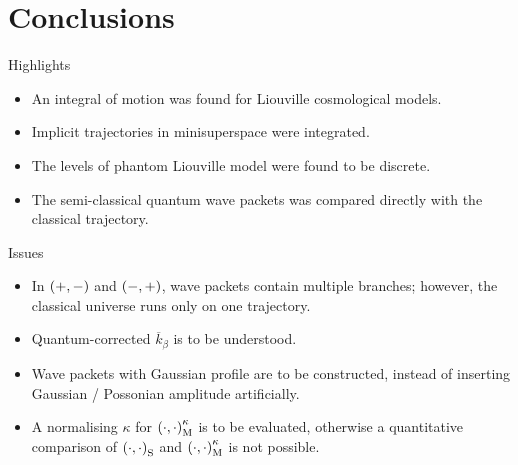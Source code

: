 \documentclass[9pt]{beamer}
\begin{document}
\section{Conclusions}

\begin{frame}%
{Highlights}%
\begin{itemize}
\item An \alert{integral of motion} was found for Liouville cosmological
models.
\item \alert{Implicit trajectories} in minisuperspace were integrated.
\item The levels of phantom Liouville model were found to be \alert{discrete}.
\item The semi-classical quantum wave packets was compared directly with the classical trajectory.
\end{itemize}
\end{frame}

\begin{frame}%
{Issues}%
\begin{itemize}
\item In ${\left(+,-\right)}$ and ${\left(-,+\right)}$, wave packets contain multiple branches; however, the classical universe runs only on one trajectory.
\item Quantum-corrected $\overline{k}_\beta$ is to be understood.
\item Wave packets with Gaussian profile are to be constructed, instead of
inserting Gaussian / Possonian amplitude artificially.
\item A normalising $\kappa$ for ${\left(\cdot,\cdot\right)}_\text{M}^\kappa$ is to be evaluated, otherwise a quantitative comparison of
${\left(\cdot,\cdot\right)}_\text{S}$ and ${\left(\cdot,\cdot\right)}_\text{M}^\kappa$ is not
possible.
\end{itemize}
\end{frame}
\end{document}
